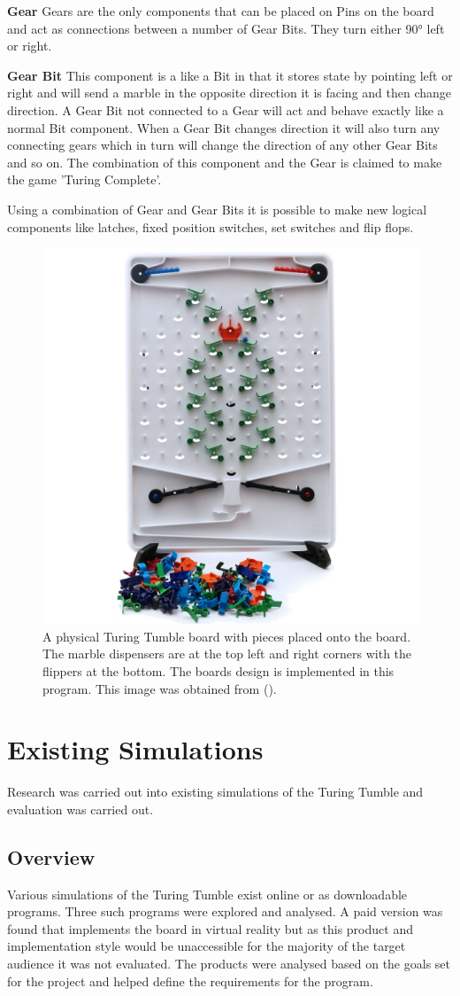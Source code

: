 \documentclass{l4proj}
\begin{document}
\textbf{Gear}
Gears are the only components that can be placed on Pins on the board and act as connections between a number of Gear Bits. They turn either 90° left or right. 

\textbf{Gear Bit}
This component is a like a Bit in that it stores state by pointing left or right and will send a marble in the opposite direction it is facing and then change direction. A Gear Bit not connected to a Gear will act and behave exactly like a normal Bit component. When a Gear Bit changes direction it will also turn any connecting gears which in turn will change the direction of any other Gear Bits and so on. The combination of this component and the Gear is claimed to make the game 'Turing Complete'.

Using a combination of Gear and Gear Bits it is possible to make new logical components like latches, fixed position switches, set switches and flip flops.

\begin{figure}
    \centering
    \includegraphics[width=0.5\linewidth]{images/turingTumbleBoard.png}
    \caption{A physical Turing Tumble board with pieces placed onto the board. The marble dispensers are at the top left and right corners with the flippers at the bottom. The boards design is implemented in this program. This image was obtained from (\cite{turing_tumble_picture}).}
    \label{fig:ttboard}
\end{figure}


\section{Existing Simulations}
Research was carried out into existing simulations of the Turing Tumble and evaluation was carried out.

\subsection{Overview}
Various simulations of the Turing Tumble exist online or as downloadable programs. Three such programs were explored and analysed. A paid version was found that implements the board in virtual reality but as this product and implementation style would be unaccessible for the majority of the target audience it was not evaluated. The products were analysed based on the goals set for the project and helped define the requirements for the program.
\end{document}
